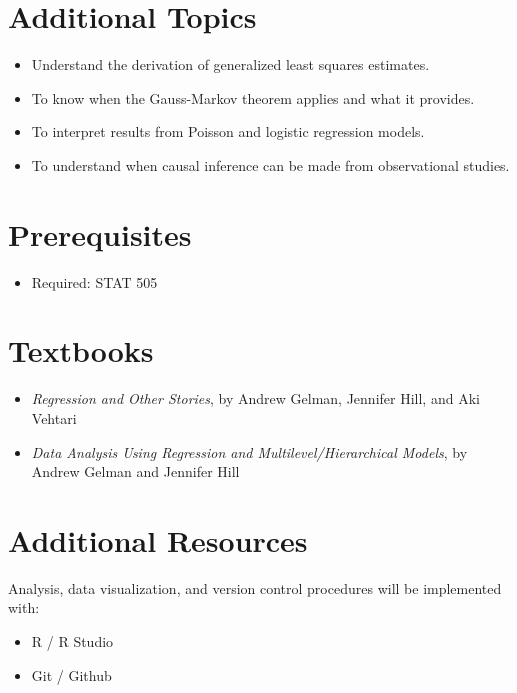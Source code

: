 \documentclass[11pt,]{article}
\providecommand{\tightlist}{%
  \setlength{\itemsep}{0pt}\setlength{\parskip}{0pt}}
\begin{document}
\hypertarget{additional-topics}{%
\section{Additional Topics}\label{additional-topics}}

\begin{itemize}
\tightlist
\item
  Understand the derivation of generalized least squares estimates.
\item
  To know when the Gauss-Markov theorem applies and what it provides.
\item
  To interpret results from Poisson and logistic regression models.
\item
  To understand when causal inference can be made from observational
  studies.
\end{itemize}

\hypertarget{prerequisites}{%
\section{Prerequisites}\label{prerequisites}}

\begin{itemize}
\tightlist
\item
  Required: STAT 505
\end{itemize}

\hypertarget{textbooks}{%
\section{Textbooks}\label{textbooks}}

\begin{itemize}
\tightlist
\item
  \emph{Regression and Other Stories}, by Andrew Gelman, Jennifer Hill,
  and Aki Vehtari
\item
  \emph{Data Analysis Using Regression and Multilevel/Hierarchical Models},
  by Andrew Gelman and Jennifer Hill
\end{itemize}

\hypertarget{additional-resources}{%
\section{Additional Resources}\label{additional-resources}}

Analysis, data visualization, and version control procedures will be
implemented with:

\begin{itemize}
\tightlist
\item
  R / R Studio
\item
  Git / Github
\end{itemize}
\end{document}
